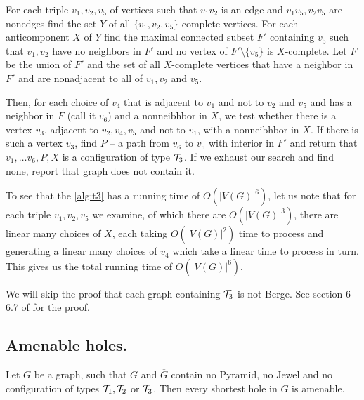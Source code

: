 	For each triple $v_1, v_2, v_5$ of vertices such that $v_1v_2$ is an edge and $v_1v_5, v_2v_5$ are nonedges find the set $Y$ of all $\{v_1, v_2, v_5\}$-complete vertices. For each anticomponent $X$ of $Y$ find the maximal connected subset $F'$ containing $v_5$ such that $v_1, v_2$ have no neighbors in $F'$ and no vertex of $F'\setminus\{v_5\}$ is $X$-complete. Let $F$ be the union of $F'$ and the set of all $X$-complete vertices that have a neighbor in $F'$ and are nonadjacent to all of $v_1, v_2$ and $v_5$.

	Then, for each choice of $v_4$ that is adjacent to $v_1$ and not to $v_2$ and $v_5$ and has a neighbor in $F$ (call it $v_6$) and a nonneibhbor in $X$, we test whether there is a vertex $v_3$, adjacent to $v_2, v_4, v_5$ and not to $v_1$, with a nonneibhbor in $X$. If there is such a vertex $v_3$, find $P$ -- a path from $v_6$ to $v_5$ with interior in $F'$ and return that $v_1, \ldots v_6, P, X$ is a configuration of type $\mathcal{T}_3$. If we exhaust our search and find none, report that graph does not contain it.

To see that the \cref{alg:t3} has a running time of $O(|V(G)|^6)$, let us note that for each triple $v_1, v_2, v_5$ we examine, of which there are $O(|V(G)|^3)$, there are linear many choices of $X$, each taking $O(|V(G)|^2)$ time to process and generating a linear many choices of $v_4$ which take a linear time to process in turn. This gives us the total running time of $O(|V(G)|^6)$.

We will skip the proof that each graph containing $\mathcal{T}_3$ is not Berge. See section 6 6.7 of \cite{MC05} for the proof.

\subsection{Amenable holes.}
\label{AmenableHoles}

\begin{theorem}
	\label{thm:amenableHoles}
	Let $G$ be a graph, such that $G$ and $\overline{G}$ contain no Pyramid, no Jewel and no configuration of types $\mathcal{T}_1, \mathcal{T}_2$ or $\mathcal{T}_3$. Then every shortest hole in $G$ is amenable.
\end{theorem}

